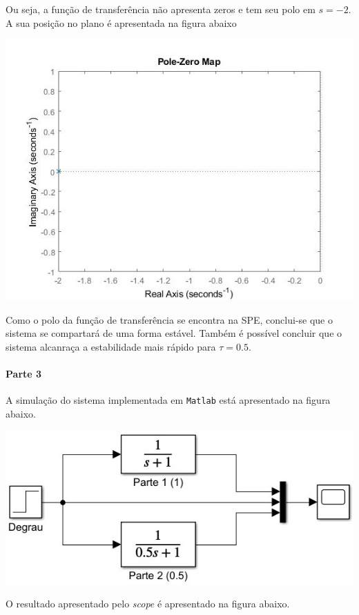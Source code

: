 \documentclass[
]{book}
\begin{document}
Ou seja, a função de transferência não apresenta zeros e tem seu polo em \(s = -2\). A sua posição no plano é apresentada na figura abaixo

\includegraphics{Imagens/Lab2/tau2.jpg}

Como o polo da função de transferência se encontra na SPE, conclui-se que o sistema se compartará de uma forma estável. Também é possível concluir que o sistema alcanraça a estabilidade mais rápido para \(\tau = 0.5\).

\hypertarget{parte-3}{%
\paragraph{Parte 3}\label{parte-3}}

A simulação do sistema implementada em \texttt{Matlab} está apresentado na figura abaixo.

\includegraphics{Imagens/Lab2/sim1.jpg}

O resultado apresentado pelo \emph{scope} é apresentado na figura abaixo.
\end{document}
